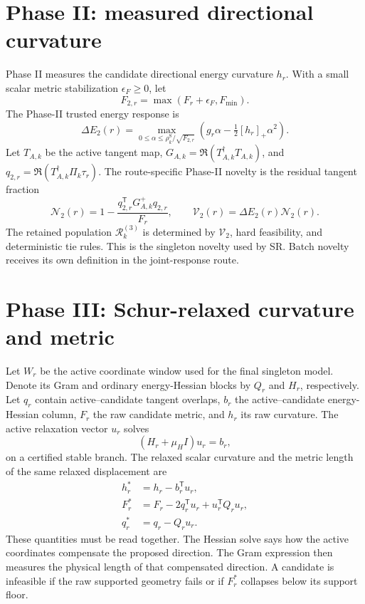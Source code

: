 \documentclass[10pt,twocolumn]{article}
\begin{document}
\section*{Phase II: measured directional curvature}

Phase II measures the candidate directional energy curvature \(h_r\). With a
small scalar metric stabilization \(\epsilon_F\geq0\), let
\begin{equation}
F_{2,r}=\max(F_r+\epsilon_F,F_{\min}).
\label{eq:sr-phase2-metric}
\end{equation}
The Phase-II trusted energy response is
\begin{equation}
\Delta E_2(r)=
\max_{0\leq\alpha\leq\rho_k^{\mathrm S}/\sqrt{F_{2,r}}}
\left(g_r\alpha-\tfrac12[h_r]_+\alpha^2\right).
\label{eq:sr-phase2}
\end{equation}
Let \(T_{A,k}\) be the active tangent map,
\(G_{A,k}=\Re(T_{A,k}^\dagger T_{A,k})\), and
\(q_{2,r}=\Re(T_{A,k}^\dagger\Pi_k\tau_r)\). The route-specific Phase-II
novelty is the residual tangent fraction
\begin{equation}
\mathcal N_2(r)=
1-\frac{q_{2,r}^{\mathsf T}G_{A,k}^{+}q_{2,r}}{F_r},
\qquad
\mathcal V_2(r)=\Delta E_2(r)\mathcal N_2(r).
\label{eq:sr-phase2-novelty}
\end{equation}
The retained population \(\mathcal R_k^{(3)}\) is determined by
\(\mathcal V_2\), hard feasibility, and deterministic tie rules. This is the
singleton novelty used by SR. Batch novelty receives its own definition in the
joint-response route.

\section*{Phase III: Schur-relaxed curvature and metric}

Let \(W_r\) be the active coordinate window used for the final singleton
model. Denote its Gram and ordinary energy-Hessian blocks by
\(Q_r\) and \(H_r\), respectively. Let \(q_r\) contain active--candidate
tangent overlaps, \(b_r\) the active--candidate energy-Hessian column,
\(F_r\) the raw candidate metric, and \(h_r\) its raw curvature. The active
relaxation vector \(u_r\) solves
\begin{equation}
(H_r+\mu_HI)u_r=b_r,
\label{eq:sr-window-relaxation}
\end{equation}
on a certified stable branch. The relaxed scalar curvature and the metric
length of the same relaxed displacement are
\begin{align}
h_r^*&=h_r-b_r^{\mathsf T}u_r,\nonumber\\
F_r^*&=F_r-2q_r^{\mathsf T}u_r+u_r^{\mathsf T}Q_ru_r,\nonumber\\
q_r^*&=q_r-Q_ru_r.
\label{eq:sr-relaxed-pair}
\end{align}
These quantities must be read together. The Hessian solve says how the active
coordinates compensate the proposed direction. The Gram expression then
measures the physical length of that compensated direction. A candidate is
infeasible if the raw supported geometry fails or if \(F_r^*\) collapses
below its support floor.
\end{document}
